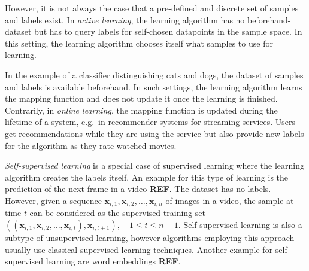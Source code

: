 However, it is not always the case that a pre-defined and discrete set of samples and labels exist.
In \textit{active learning}, the learning algorithm has no beforehand-dataset but has to query labels for self-chosen datapoints in the sample space.
In this setting, the learning algorithm chooses itself what samples to use for learning.

In the example of a classifier distinguishing cats and dogs, the dataset of samples and labels is available beforehand.
In such settings, the learning algorithm learns the mapping function and does not update it once the learning is finished.
Contrarily, in \textit{online learning}, the mapping function is updated during the lifetime of a system, e.g.~in recommender systems for streaming services.
Users get recommendations while they are using the service but also provide new labels for the algorithm as they rate watched movies.

\textit{Self-supervised learning} is a special case of supervised learning where the learning algorithm creates the labels itself.
An example for this type of learning is the prediction of the next frame in a video \textbf{REF}.
The dataset has no labels.
However, given a sequence $\bm{x}_{i,1},\bm{x}_{i,2},\dots,\bm{x}_{i,n}$ of images in a video, the sample at time $t$ can be considered as the supervised training set $((\bm{x}_{i,1},\bm{x}_{i,2},\dots,\bm{x}_{i,t}),\bm{x}_{i,t+1}), \quad 1\leq t\leq n-1$.
Self-supervised learning is also a subtype of unsupervised learning, however algorithms employing this approach usually use classical supervised learning techniques.
Another example for self-supervised learning are word embeddings \textbf{REF}.


